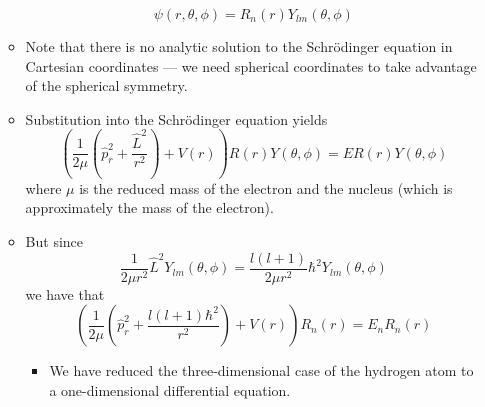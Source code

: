 \documentclass[../notes.tex]{subfiles}
\begin{document}
\begin{itemize}
\begin{itemize}
        \begin{equation*}
            \psi(r,\theta,\phi) = R_n(r)Y_{lm}(\theta,\phi)
        \end{equation*}
        \item Note that there is no analytic solution to the Schr\"{o}dinger equation in Cartesian coordinates --- we need spherical coordinates to take advantage of the spherical symmetry.
        \item Substitution into the Schr\"{o}dinger equation yields
        \begin{equation*}
            \left( \frac{1}{2\mu}\left( \hat{p}_r^2+\frac{\hat{L}^2}{r^2} \right)+V(r) \right)R(r)Y(\theta,\phi) = ER(r)Y(\theta,\phi)
        \end{equation*}
        where $\mu$ is the reduced mass of the electron and the nucleus (which is approximately the mass of the electron).
        \item But since
        \begin{equation*}
            \frac{1}{2\mu r^2}\hat{L}^2Y_{lm}(\theta,\phi) = \frac{l(l+1)}{2\mu r^2}\hbar^2Y_{lm}(\theta,\phi)
        \end{equation*}
        we have that
        \begin{equation*}
            \left( \frac{1}{2\mu}\left( \hat{p}_r^2+\frac{l(l+1)\hbar^2}{r^2} \right)+V(r) \right)R_n(r) = E_nR_n(r)
        \end{equation*}
        \begin{itemize}
            \item We have reduced the three-dimensional case of the hydrogen atom to a one-dimensional differential equation.
        \end{itemize}
    \end{itemize}
\end{itemize}
\end{document}
